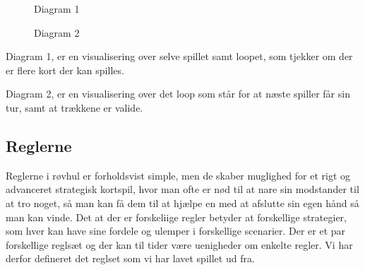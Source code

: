 \documentclass[a4paper, 12pt]{article}
\begin{document}
\begin{figure}[H]
	\centering
	
	\caption{Diagram 1}
\end{figure}

\begin{figure}[H]
	\centering
	
	\caption{Diagram 2}
\end{figure}

Diagram 1, er en visualisering over selve spillet samt loopet, som tjekker om der er flere kort der kan spilles.
\bigbreak

Diagram 2, er en visualisering over det loop som står for at næste spiller får sin tur, samt at trækkene er valide.

\vfill
\pagebreak


\subsection{Reglerne}
Reglerne i røvhul er forholdsvist simple, men de skaber muglighed for et rigt og advanceret strategisk kortspil, hvor man ofte er nød til at nare sin modstander til at tro noget, så man kan få dem til at hjælpe en med at afslutte sin egen hånd så man kan vinde.
Det at der er forskeliige regler betyder at forskellige strategier, som hver kan have sine fordele og ulemper i forskellige scenarier. 
Der er et par forskellige reglsæt og der kan til tider være uenigheder om enkelte regler. Vi har derfor defineret det reglset som vi har lavet spillet ud fra.
\end{document}
